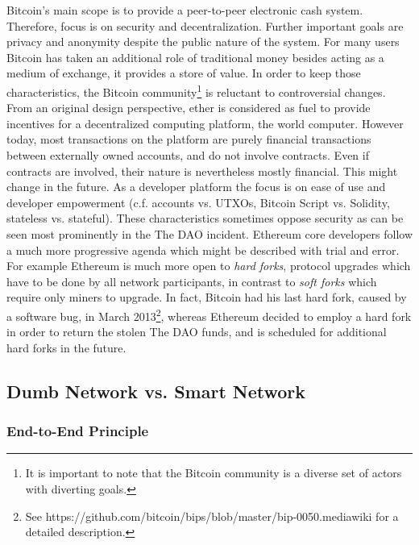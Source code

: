 Bitcoin's main scope is to provide a peer-to-peer electronic cash system. Therefore, focus is on security and decentralization. Further important goals are privacy and anonymity despite the public nature of the system. For many users Bitcoin has taken an additional role of traditional money besides acting as a medium of exchange, it provides a store of value. In order to keep those characteristics, the Bitcoin community\footnote{It is important to note that the Bitcoin community is a diverse set of actors with diverting goals.} is reluctant to controversial changes. From an original design perspective, ether is considered as fuel to provide incentives for a decentralized computing platform, the world computer. However today, most transactions on the platform are purely financial transactions between externally owned accounts, and do not involve contracts. Even if contracts are involved, their nature is nevertheless mostly financial. This might change in the future. As a developer platform the focus is on ease of use and developer empowerment (c.f. accounts vs. UTXOs, Bitcoin Script vs. Solidity, stateless vs. stateful). These characteristics sometimes oppose security as can be seen most prominently in the {The DAO} incident. Ethereum core developers follow a much more progressive agenda which might be described with trial and error. For example Ethereum is much more open to \emph{hard forks}, protocol upgrades which have to be done by all network participants, in contrast to \emph{soft forks} which require only miners to upgrade. In fact, Bitcoin had his last hard fork, caused by a software bug, in March 2013\footnote{See https://github.com/bitcoin/bips/blob/master/bip-0050.mediawiki for a detailed description.}, whereas Ethereum decided to employ a hard fork in order to return the stolen The DAO funds, and is scheduled for additional hard forks in the future. 

\subsection{Dumb Network vs. Smart Network}

\subsubsection{End-to-End Principle}

